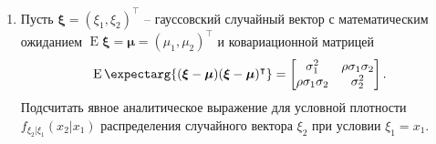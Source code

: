 \documentclass[a4paper,12pt]{extreport}
\renewcommand{\=}[1]{\stackrel{#1}{=}} %
\newcommand{\Expect}{\mathop{{}\mathrm{E}}}
\newcommand{\Expectmore}{\operatorname{E}\expectarg}
\newcommand{\generaltime}{t \geqslant 0}
\newcommand{\newprocess}[1]{
    \ensuremath{
        #1 = \left(#1 _t\right)_{\generaltime}
    }
}
\begin{document}
\newpage

\section*{}

\begin{enumerate}



    \item Пусть $\bm{\xi} = (\xi_1, \xi_2)^{\intercal}$ -- гауссовский случайный вектор
    с математическим ожиданием $\Expect \bm{\xi} = \bm{\mu} = (\mu_1, \mu_2)^{\intercal}$
    и ковариационной матрицей 
    \[
    \Expectmore{(\bm{\xi} - \bm{\mu})(\bm{\xi} - \bm{\mu})^{\intercal}} = 
      \begin{bmatrix}
        \sigma_1^2 & \rho \sigma_1 \sigma_2\\
        \rho \sigma_1 \sigma_2 & \sigma_2^2
      \end{bmatrix}.
    \]
    Подсчитать явное аналитическое выражение для условной плотности
    $f_{\xi_2|\xi_1}(x_2 | x_1)$
    распределения случайного вектора $\xi_2$ при условии $\xi_1 = x_1$.


\end{enumerate}
\end{document}

